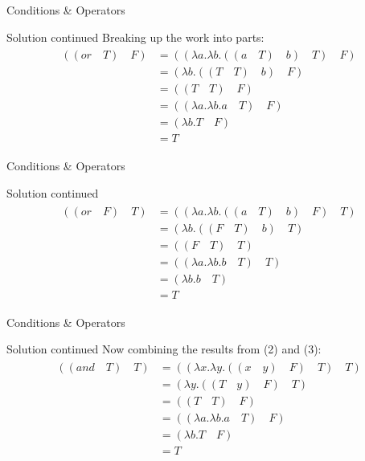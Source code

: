\documentclass{beamer}
\begin{document}
\begin{frame}{Conditions \& Operators}
\begin{block}{Solution continued}
Breaking up the work into parts:
\begin{align}
\begin{split}
	((or \quad T) \quad F) &= ((\lambda a . \lambda b . ((a \quad T) \quad b) \quad T) \quad F) \\
    &= (\lambda b . ((T \quad T) \quad b) \quad F) \\
    &= ((T \quad T) \quad F) \\
    &= ((\lambda a . \lambda b . a \quad T) \quad F) \\
    &= (\lambda b . T \quad F) \\
    &= T
\end{split}
\end{align}
\end{block}
\end{frame}

\begin{frame}{Conditions \& Operators}
\begin{block}{Solution continued}
\begin{align}
\begin{split}
	((or \quad F) \quad T) &= ((\lambda a . \lambda b . ((a \quad T) \quad b) \quad F) \quad T) \\
    &= (\lambda b . ((F \quad T) \quad b) \quad T) \\
    &= ((F \quad T) \quad T) \\
    &= ((\lambda a . \lambda b . b \quad T) \quad T) \\
    &= (\lambda b . b \quad T) \\
    &= T
\end{split}
\end{align}
\end{block}
\end{frame}

\begin{frame}{Conditions \& Operators}
\begin{block}{Solution continued}
Now combining the results from (2) and (3):
\begin{align}
\begin{split}
	((and \quad T) \quad T) &= ((\lambda x . \lambda y . ((x \quad y) \quad F) \quad T) \quad T) \\
    &= (\lambda y . ((T \quad y) \quad F) \quad T) \\
    &= ((T \quad T) \quad F) \\
    &= ((\lambda a . \lambda b . a \quad T) \quad F) \\
    &= (\lambda b . T \quad F) \\
    &= T
\end{split}
\end{align}
\end{block}
\end{frame}
\end{document}
